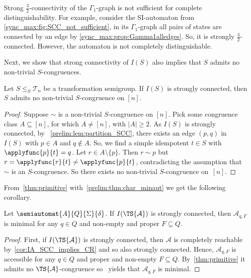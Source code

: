 \begin{example}
	Strong $\frac{3}{2}$-connectivity of the $\Gamma_1$-graph
	is not sufficient for complete distinguishability.
	For example, consider the SI-automaton 
	from \cref{sync_max:fig:SCC_not_sufficient},
	in its $\Gamma_1$-graph all pairs of states
	are connected by an edge by \cref{sync_max:prop:Gamma1alledges}.
	So, it is  strongly $\frac{3}{2}$-connected.
	However, the automaton is not completely distinguishable.
\end{example}

Next, we show that strong connectivity of $I(S)$ also implies
that $S$ admits no non-trivial $S$-congruences.

\begin{theorem}\label{thm:primitive}
	Let $S \le_S \mathcal T_n$ be a transformation semigroup. If $I(S)$ is strongly connected,
	then $S$ admits no non-trivial $S$-congruence on $[n]$.
\end{theorem}
\begin{proof}
	Suppose $\sim$ is a non-trivial $S$-congruence on $[n]$.
	Pick some congruence class $A \subseteq [n]$, for which $A \ne [n]$,
	with $|A| \ge 2$. 
	As $I(S)$ is strongly connected, by \LEM~\ref{prelim:lem:partition_SCC}, there exists an edge $(p, q)$ in~$I(S)$
	with $p \in A$ and $q \notin A$. 
	So, we find a simple idempotent $t \in S$
	with $\applyfunc{p}{t} = q$.
	Let $r \in A \setminus \{p\}$.
	Then $r \sim p$ but $r = \applyfunc{r}{t} \not\sim \applyfunc{p}{t}$,
	contradicting the assumption that $\sim$
	is an $S$-congruence. So there exists no non-trivial $S$-congruence on~$[n]$.    
\end{proof}

From~\cref{thm:primitive} with~\cref{prelim:thm:char_minaut}
we get the following corollary.

\begin{corollary}\label{cor:primitive}
	Let $\semiautomat{A}{Q}{\Sigma}{\delta}$.
	If $I(\TS{\mathcal A})$ is strongly connected,
	then $\mathcal A_{q, F}$ is minimal for any $q \in Q$
	and non-empty and proper $F \subseteq Q$.
\end{corollary}
\begin{proof}
	First, if $I(\TS{\mathcal A})$ is strongly connected, 
	then $\mathcal A$ is completely reachable
	by~\cref{cor:IA_SCC_implies_CR} and so also strongly connected.
	Hence, $\mathcal A_{q,F}$ is accessible for any $q \in Q$
	and proper and non-empty $F \subseteq Q$.
	By~\cref{thm:primitive} 
	it admits no $\TS{\mathcal A}$-congruence
	so~ yields	that $\mathcal A_{q, F}$ is minimal.	
\end{proof}